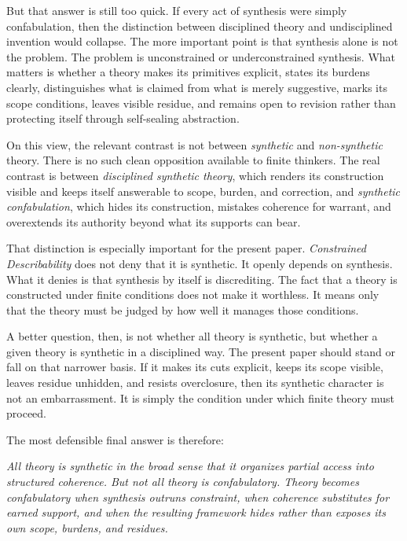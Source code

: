 \documentclass[11pt]{article}
\renewenvironment{quote}
  {\list{}{\leftmargin=1.4em \rightmargin=1.0em}%
   \item\relax\color{softink}\itshape}
  {\endlist}
\renewcommand{\emph}[1]{\textit{#1}}
\begin{document}
But that answer is still too quick. If every act of synthesis were simply confabulation, then the distinction between disciplined theory and undisciplined invention would collapse. The more important point is that synthesis alone is not the problem. The problem is unconstrained or underconstrained synthesis. What matters is whether a theory makes its primitives explicit, states its burdens clearly, distinguishes what is claimed from what is merely suggestive, marks its scope conditions, leaves visible residue, and remains open to revision rather than protecting itself through self-sealing abstraction.

On this view, the relevant contrast is not between \emph{synthetic} and \emph{non-synthetic} theory. There is no such clean opposition available to finite thinkers. The real contrast is between \emph{disciplined synthetic theory}, which renders its construction visible and keeps itself answerable to scope, burden, and correction, and \emph{synthetic confabulation}, which hides its construction, mistakes coherence for warrant, and overextends its authority beyond what its supports can bear.

That distinction is especially important for the present paper. \emph{Constrained Describability} does not deny that it is synthetic. It openly depends on synthesis. What it denies is that synthesis by itself is discrediting. The fact that a theory is constructed under finite conditions does not make it worthless. It means only that the theory must be judged by how well it manages those conditions.

A better question, then, is not whether all theory is synthetic, but whether a given theory is synthetic in a disciplined way. The present paper should stand or fall on that narrower basis. If it makes its cuts explicit, keeps its scope visible, leaves residue unhidden, and resists overclosure, then its synthetic character is not an embarrassment. It is simply the condition under which finite theory must proceed.

The most defensible final answer is therefore:
\begin{quote}
All theory is synthetic in the broad sense that it organizes partial access into structured coherence. But not all theory is confabulatory. Theory becomes confabulatory when synthesis outruns constraint, when coherence substitutes for earned support, and when the resulting framework hides rather than exposes its own scope, burdens, and residues.
\end{quote}
\end{document}
